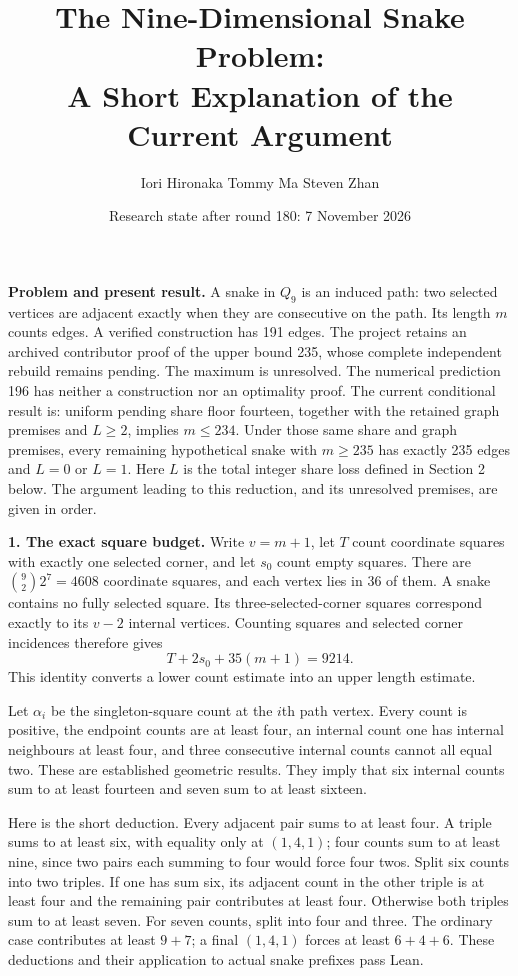 \documentclass[11pt,a4paper]{article}
\title{The Nine-Dimensional Snake Problem:\\A Short Explanation of the Current Argument}
\author{Iori Hironaka \quad Tommy Ma \quad Steven Zhan}
\date{Research state after round 180: 7 November 2026}
\begin{document}
\maketitle

\textbf{Problem and present result.}
A snake in $Q_9$ is an induced path: two selected vertices are adjacent
exactly when they are consecutive on the path. Its length $m$ counts
edges. A verified construction has 191 edges. The project retains an
archived contributor proof of the upper bound 235, whose complete
independent rebuild remains pending. The maximum is unresolved.
The numerical prediction 196 has neither a construction nor an optimality
proof. The current conditional result is: uniform pending share floor
fourteen, together with the retained graph premises and $L\ge2$, implies
$m\le234$. Under those same share and graph premises, every remaining
hypothetical snake with $m\ge235$ has exactly 235 edges and $L=0$ or $L=1$.
Here $L$ is the total integer share loss defined in Section 2 below.
The argument leading to this reduction, and its unresolved premises,
are given in order.

\textbf{1. The exact square budget.}
Write $v=m+1$, let $T$ count coordinate squares with exactly one selected
corner, and let $s_0$ count empty squares. There are
$\binom92 2^7=4608$ coordinate squares, and each vertex lies in 36 of them.
A snake contains no fully selected square. Its three-selected-corner
squares correspond exactly to its $v-2$ internal vertices. Counting
squares and selected corner incidences therefore gives
\[
\boxed{T+2s_0+35(m+1)=9214.}
\]
This identity converts a lower count estimate into an upper length estimate.

Let $\alpha_i$ be the singleton-square count at the $i$th path vertex.
Every count is positive, the endpoint counts are at least four, an internal
count one has internal neighbours at least four, and three consecutive
internal counts cannot all equal two. These are established geometric
results. They imply that six internal counts sum to at least fourteen and
seven sum to at least sixteen.

Here is the short deduction. Every adjacent pair sums to at least four.
A triple sums to at least six, with equality only at $(1,4,1)$; four
counts sum to at least nine, since two pairs each summing to four would
force four twos. Split six counts into two triples. If one has sum six,
its adjacent count in the other triple is at least four and the remaining
pair contributes at least four. Otherwise both triples sum to at least
seven. For seven counts, split into four and three. The ordinary case
contributes at least $9+7$; a final $(1,4,1)$ forces at least $6+4+6$.
These deductions and their application to actual snake prefixes pass Lean.
\end{document}
